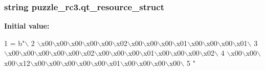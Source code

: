 \subsubsection[{qt\+\_\+resource\+\_\+struct}]{\setlength{\rightskip}{0pt plus 5cm}string puzzle\+\_\+rc3.\+qt\+\_\+resource\+\_\+struct}\label{namespacepuzzle__rc3_ac6cd6e66d0a70a05d96458efeadc6555}
{\bfseries Initial value\+:}
\begin{DoxyCode}
1 = b\textcolor{stringliteral}{"\(\backslash\)}
2 \textcolor{stringliteral}{\(\backslash\)x00\(\backslash\)x00\(\backslash\)x00\(\backslash\)x00\(\backslash\)x00\(\backslash\)x02\(\backslash\)x00\(\backslash\)x00\(\backslash\)x00\(\backslash\)x01\(\backslash\)x00\(\backslash\)x00\(\backslash\)x00\(\backslash\)x01\(\backslash\)}
3 \textcolor{stringliteral}{\(\backslash\)x00\(\backslash\)x00\(\backslash\)x00\(\backslash\)x00\(\backslash\)x00\(\backslash\)x02\(\backslash\)x00\(\backslash\)x00\(\backslash\)x00\(\backslash\)x01\(\backslash\)x00\(\backslash\)x00\(\backslash\)x00\(\backslash\)x02\(\backslash\)}
4 \textcolor{stringliteral}{\(\backslash\)x00\(\backslash\)x00\(\backslash\)x00\(\backslash\)x12\(\backslash\)x00\(\backslash\)x00\(\backslash\)x00\(\backslash\)x00\(\backslash\)x00\(\backslash\)x01\(\backslash\)x00\(\backslash\)x00\(\backslash\)x00\(\backslash\)x00\(\backslash\)}
5 \textcolor{stringliteral}{"}
\end{DoxyCode}
